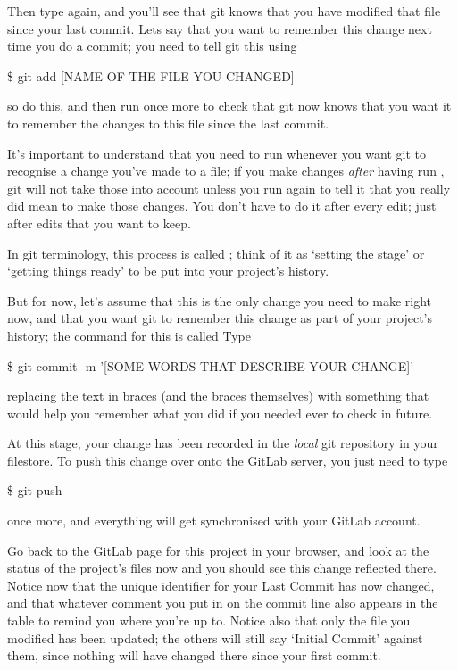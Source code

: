 Then type  again, and you'll see that git knows that you have modified that file since your last commit. Lets say that you want to remember this change next time you do a commit; you need to tell git this using 

\begin{ttoutenv}
\$ git add [NAME OF THE FILE YOU CHANGED]
\end{ttoutenv}

so do this, and then run  once more to check that git now knows that you want it to remember the changes to this file since the last commit. 

It's important to understand that you need to run  whenever you want git to recognise a change you've made to a file; if you make changes \emph{after} having run , git will not take those into account unless you run  again to tell it that you really did mean to make those changes. You don't have to do it after every edit; just after edits that you want to keep. 

In git terminology, this process is called ; think of it as `setting the stage' or `getting things ready' to be put into your project's history. 

But for now, let's assume that this is the only change you need to make right now, and that you want  git to remember this change as part of your project's history; the command for this is called  Type

\begin{ttoutenv}
\$ git commit -m '[SOME WORDS THAT DESCRIBE YOUR CHANGE]'
\end{ttoutenv}

replacing the text in braces (and the braces themselves) with something that would help you remember what you did if you needed ever to check in future. 

At this stage, your change has been recorded in the \emph{local} git repository in your filestore. To push this change over onto the GitLab server, you just need to type

\begin{ttoutenv}
\$ git push
\end{ttoutenv}

once more, and everything will get synchronised with your GitLab account.

Go back to the GitLab page for this project in your browser, and look at the status of the project's files now and you should see this change reflected there. Notice now that the unique identifier for your Last Commit has now changed, and that whatever comment you put in on the commit line also appears in the table to remind you where you're up to. 
Notice also that only the file you modified has been updated; the others will still say `Initial Commit' against them, since nothing will have changed there since your first commit. 

